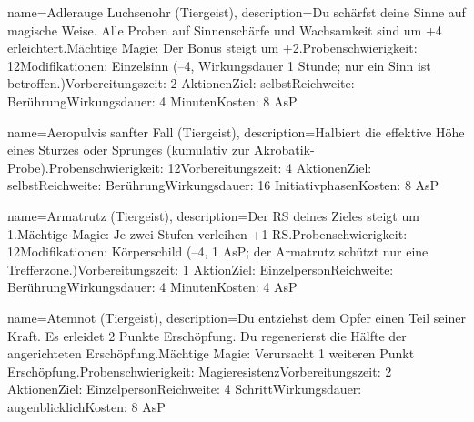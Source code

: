 {
    name={Adlerauge Luchsenohr (Tiergeist)},
    description={Du schärfst deine Sinne auf magische Weise. Alle Proben auf Sinnenschärfe und Wachsamkeit sind um +4 erleichtert.\newline Mächtige Magie: Der Bonus steigt um +2.\newline Probenschwierigkeit: 12\newline Modifikationen: Einzelsinn (–4, Wirkungsdauer 1 Stunde; nur ein Sinn ist betroffen.)\newline Vorbereitungszeit: 2 Aktionen\newline Ziel: selbst\newline Reichweite: Berührung\newline Wirkungsdauer: 4 Minuten\newline Kosten: 8 AsP}
}


{
    name={Aeropulvis sanfter Fall (Tiergeist)},
    description={Halbiert die effektive Höhe eines Sturzes oder Sprunges (kumulativ zur Akrobatik-Probe).\newline Probenschwierigkeit: 12\newline Vorbereitungszeit: 4 Aktionen\newline Ziel: selbst\newline Reichweite: Berührung\newline Wirkungsdauer: 16 Initiativphasen\newline Kosten: 8 AsP}
}


{
    name={Armatrutz (Tiergeist)},
    description={Der RS deines Zieles steigt um 1.\newline Mächtige Magie: Je zwei Stufen verleihen +1 RS.\newline Probenschwierigkeit: 12\newline Modifikationen: Körperschild (–4, 1 AsP; der Armatrutz schützt nur eine Trefferzone.)\newline Vorbereitungszeit: 1 Aktion\newline Ziel: Einzelperson\newline Reichweite: Berührung\newline Wirkungsdauer: 4 Minuten\newline Kosten: 4 AsP}
}


{
    name={Atemnot (Tiergeist)},
    description={Du entziehst dem Opfer einen Teil seiner Kraft. Es erleidet 2 Punkte Erschöpfung. Du regenerierst die Hälfte der angerichteten Erschöpfung.\newline Mächtige Magie: Verursacht 1 weiteren Punkt Erschöpfung.\newline Probenschwierigkeit: Magieresistenz\newline Vorbereitungszeit: 2 Aktionen\newline Ziel: Einzelperson\newline Reichweite: 4 Schritt\newline Wirkungsdauer: augenblicklich\newline Kosten: 8 AsP}
}


